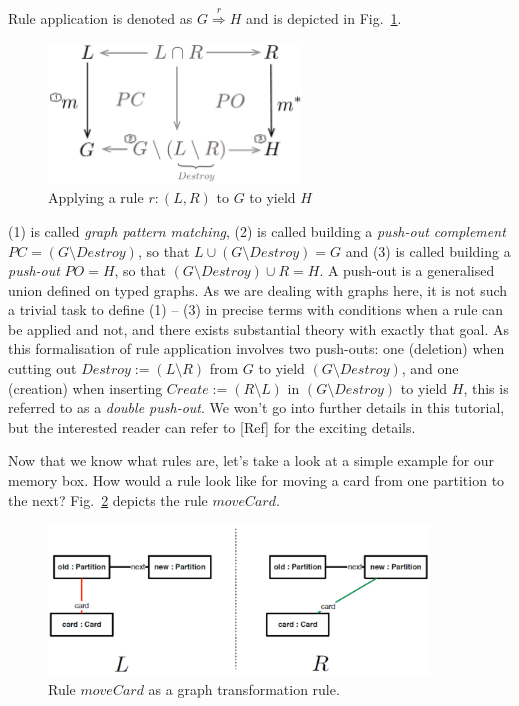 Rule application is denoted as $G \stackrel{r}{\Rightarrow} H$ and is depicted
in Fig.~\ref{fig:rule_application}. 

\begin{figure}[htp]
\begin{center}
  \includegraphics[width=0.6\textwidth]{pics/rule_application}
  \caption[]{Applying a rule $r: (L,R)$ to $G$ to yield $H$} 
  \label{fig:rule_application}
\end{center}
\end{figure}

(1) is called \emph{graph pattern matching}, (2) is called building a
\emph{push-out complement} $PC = (G\setminus Destroy)$, so that $L \cup
(G\setminus Destroy) = G$ and (3) is called building a \emph{push-out} $PO = H$,
so that $(G\setminus Destroy) \cup R = H$. A push-out is a generalised union
defined on typed graphs.  As we are dealing with graphs here, it is not such a
trivial task to define (1) -- (3) in precise terms with conditions when a rule
can be applied and not, and there exists substantial theory with exactly that
goal. As this formalisation of rule application involves two push-outs: one
(deletion) when cutting out $Destroy := (L\setminus R)$ from $G$ to yield
$(G\setminus Destroy)$, and one (creation) when inserting $Create := (R\setminus
L)$ in $(G\setminus Destroy)$ to yield $H$, this is referred to as a
\emph{double push-out}.  
We won't go into further details in this tutorial, but the interested reader can
refer to [Ref] for the exciting details.  

Now that we know what rules are, let's take a look at a simple example for our
memory box. How would a rule look like for moving a card from one partition to
the next?  Fig.~\ref{fig:rule_example} depicts the rule $moveCard$.

\begin{figure}[htp]
\begin{center}
  \includegraphics[width=0.9\textwidth]{pics/rule_example}
  \caption[]{Rule $moveCard$ as a graph transformation rule.}	
  \label{fig:rule_example}
\end{center}
\end{figure}

